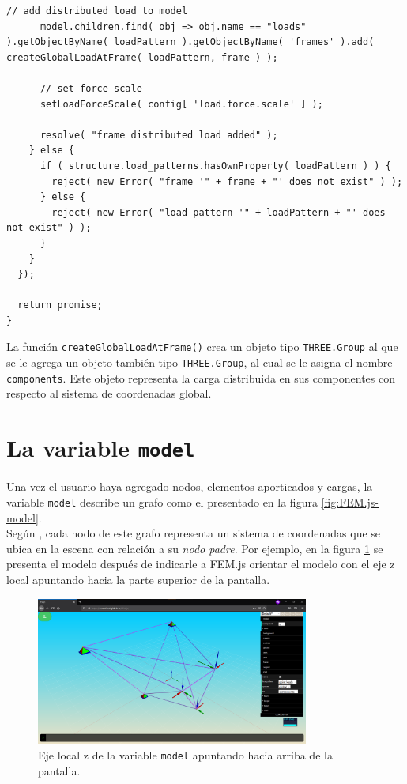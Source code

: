 \begin{lstlisting}[language={},caption=Función \texttt{addUniformlyDistributedLoadAtFrame()} implementada en el archivo \texttt{FEM.js}.,label=alg:FEM.js-addUniformlyDistributedLoadAtFrame, frame=single]
      // add distributed load to model
      model.children.find( obj => obj.name == "loads" ).getObjectByName( loadPattern ).getObjectByName( 'frames' ).add( createGlobalLoadAtFrame( loadPattern, frame ) );

      // set force scale
      setLoadForceScale( config[ 'load.force.scale' ] );

      resolve( "frame distributed load added" );
    } else {
      if ( structure.load_patterns.hasOwnProperty( loadPattern ) ) {
        reject( new Error( "frame '" + frame + "' does not exist" ) );
      } else {
        reject( new Error( "load pattern '" + loadPattern + "' does not exist" ) );
      }
    }
  });

  return promise;
}
\end{lstlisting}
\bigskip

La función \verb|createGlobalLoadAtFrame()| crea un objeto tipo \verb|THREE.Group| al que se le agrega un objeto también tipo \verb|THREE.Group|, al cual se le asigna el nombre \verb|components|. Este objeto representa la carga distribuida en sus componentes con respecto al sistema de coordenadas global.\\

\section{La variable \texttt{model}}

Una vez el usuario haya agregado nodos, elementos aporticados y cargas, la variable \verb|model| describe un grafo como el presentado en la figura \ref{fig:FEM.js-model}.\\

Según \cite{threejs-sceneGraph}, cada nodo de este grafo representa un sistema de coordenadas que se ubica en la escena con relación a su \emph{nodo padre}. Por ejemplo, en la figura \ref{fig:FEM.js-setModelRotation} se presenta el modelo después de indicarle a FEM.js orientar el modelo con el eje z local apuntando hacia la parte superior de la pantalla.\\

\begin{figure}[h!]
  \centering
  \includegraphics[width=0.8\textwidth]{FEM.js/FEM.js-setModelRotation.png}
  \caption{Eje local z de la variable \texttt{model} apuntando hacia arriba de la pantalla.}
  \label{fig:FEM.js-setModelRotation}
\end{figure}

